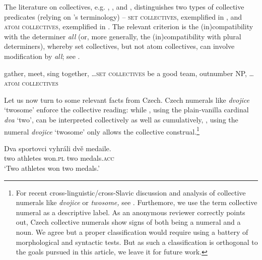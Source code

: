 \documentclass[output=paper,colorlinks,citecolor=brown,newtxmath]{langscibook}
\begin{document}
\z

\noindent The literature on collectives, e.g. \cite{Dowty1987}, \cite{Winter2002}, and \cite{Brisson2003}, distinguishes two types of collective predicates (relying on \citeauthor{Winter2002}'s terminology) -- \textsc{set collectives}, exemplified in , and \textsc{atom collectives}, exemplified in . The relevant criterion is the (in)compatibility with the determiner \textit{all} (or, more generally, the (in)compatibility with plural determiners), whereby set collectives, but not atom collectives, can involve modification by \textit{all}; see .

\ea \ea\label{ex:line241-a} gather, meet, sing together, \ldots{}\hfill \textsc{set collectives}
\ex\label{ex:line241-b} be a good team, outnumber NP, \ldots{}\hfill \textsc{atom collectives}
\z\z

\ea\label{ex:line246}
\z\z

\noindent Let us now turn to some relevant facts from Czech. Czech numerals like \textit{dvojice} `twosome' enforce the collective reading: while , using the plain-vanilla cardinal \textit{dva} `two', can be interpreted collectively as well as cumulatively, , using the numeral \textit{dvojice} `twosome' only allows the collective construal.\footnote{For recent cross-linguistic/cross-Slavic discussion and analysis of collective numerals like \textit{dvojice} or \textit{twosome,} see \citet{Grimm.Docekaltoappear}. Furthemore, we use the term collective numeral as a descriptive label. As an anonymous reviewer correctly points out, Czech collective numerals show signs of both being a numeral and a noun. We agree but a proper classification would require using a battery of morphological and syntactic tests. But as such a classification is orthogonal to the goals pursued in this article, we leave it for future work.}

\ea\label{ex:line256-a}\gll Dva sportovci vyhráli dvě medaile.\\
two athletes won.\textsc{pl} two medals.\textsc{acc}\\
\glt `Two athletes won two medals.'\\
\z\z
\end{document}
